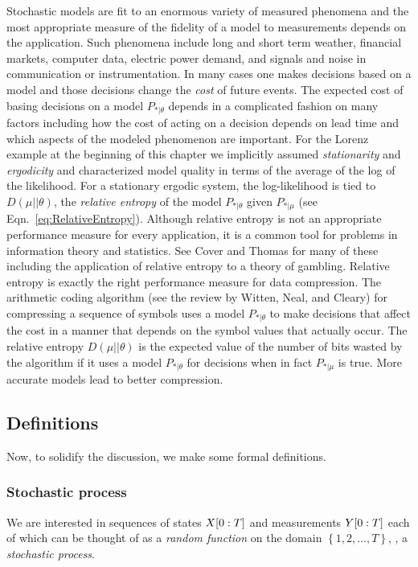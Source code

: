 Stochastic models are fit to an enormous variety of measured phenomena
and the most appropriate measure of the fidelity of a model to
measurements depends on the application.  Such phenomena include long
and short term weather, financial markets, computer data, electric
power demand, and signals and noise in communication or
instrumentation.  In many cases one makes decisions based on a model
and those decisions change the \emph{cost} of future events.  The
expected cost of basing decisions on a model $P_{*|\theta}$ depends in
a complicated fashion on many factors including how the cost of acting
on a decision depends on lead time and which aspects of the modeled
phenomenon are important.  For the Lorenz example at the beginning of
this chapter we implicitly assumed \emph{stationarity} and
\emph{ergodicity} and characterized model quality in terms of the
average of the log of the likelihood.  For a stationary ergodic
system, the log-likelihood is tied to $D(\mu||\theta)$, the
\emph{relative entropy} of the model $P_{*|\theta}$ given $P_{*|\mu}$
(see Eqn.~\eqref{eq:RelativeEntropy}).  Although relative entropy is
not an appropriate performance measure for every application, it is a
common tool for problems in information theory and statistics.  See
Cover and Thomas\cite{Cover91} for many of these including the
application of relative entropy to a theory of gambling.  Relative
entropy is exactly the right performance measure for data compression.
The arithmetic coding algorithm (see the review by Witten, Neal, and
Cleary\cite{Witten87}) for compressing a sequence of symbols uses a
model $P_{*|\theta}$ to make decisions that affect the cost in a
manner that depends on the symbol values that actually occur.  The
relative entropy $D(\mu||\theta)$ is the expected value of the number
of bits wasted by the algorithm if it uses a model $P_{*|\theta}$ for
decisions when in fact $P_{*|\mu}$ is true.  More accurate models lead
to better compression.

\subsection{Definitions}
\label{sec:hDef}

Now, to solidify the discussion, we make some formal definitions.

\subsubsection{Stochastic process}
We are interested in sequences of states $X[0:T]$ and
measurements  $Y[0:T]$ each of which can be thought of as a
\emph{random function} on the domain $\left\{ 1,2,\ldots,T \right\}$,
\ie, a \emph{stochastic process}.


